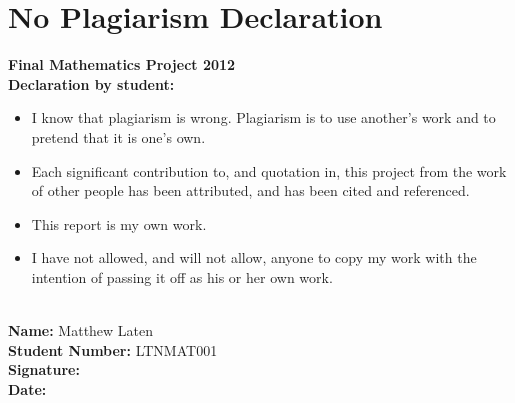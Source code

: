 \section*{No Plagiarism Declaration\\}
\Large{\textbf{Final Mathematics Project 2012}\\}
\large{\textbf{Declaration by student:}}
\begin{itemize}
\item I know that plagiarism is wrong. Plagiarism is to use another's work and to pretend that it is one's own.
\item Each significant contribution to, and quotation in, this project from the work of other people has been attributed, and has been cited and referenced.
\item This report is my own work.
\item I have not allowed, and will not allow, anyone to copy my work with the intention of passing it off as his or her own work.\\\\
\end{itemize}
\textbf{Name:} Matthew Laten\\
\textbf{Student Number:} LTNMAT001\\
\textbf{Signature:}\\
\textbf{Date:}\\
